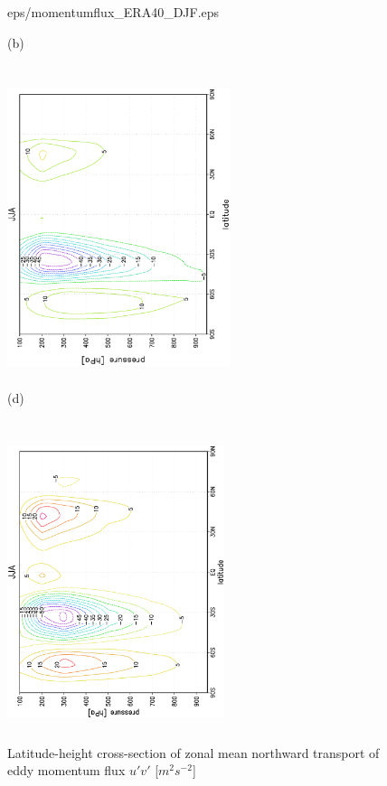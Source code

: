 \documentclass[12pt,a4paper,twoside,openright,headinclude,liststotoc,bibtotoc]{scrreprt}
\begin{document}
\begin{figure}[c]
{{eps/momentumflux_ERA40_DJF.eps}
}
\parbox{8.5cm}{\hspace{1.05cm}\begin{scriptsize}(b)\end{scriptsize} \vspace{-0.5cm} \\
\includegraphics[height=8.5cm,width=6.5cm,angle=-90]
{eps/tmJJAmomentumflux.eps}
}
\parbox{8.5cm}{\hspace{0.95cm}\begin{scriptsize}(d)\end{scriptsize} \vspace{-0.55cm} \\
\includegraphics[height=8.5cm,width=6.35cm,angle=-90]
{eps/momentumflux_ERA40_JJA.eps}
}
\caption[Eddy momentum flux for DJF and JJA]{Latitude-height cross-section of zonal mean northward transport of eddy momentum flux $u'v'$ [$m^{2}s^{-2}$]}
\label{img:eddymom}
\end{figure}
\end{document}
